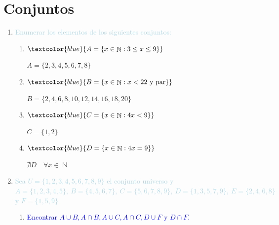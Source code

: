 \documentclass{article}
\newcommand{\lb}[1]{\textcolor{lightblue}{#1}}
\newcommand{\db}[1]{\textcolor{blue}{#1}}
\DeclareMathOperator{\N}{\mathbb{N}}
\begin{document}
\section{Conjuntos}
\begin{enumerate}[label=\color{red}\textbf{\arabic*)},leftmargin=*]
      \item \lb{Enumerar los elementos de los siguientes conjuntos:}
      \begin{enumerate}[label=\color{red}\alph*)]
      	\item $\db{A=\{x\in\N:3\le x\le 9\}}$
      	
      	$A=\{2,3,4,5,6,7,8\}$
      	\item $\db{B=\{x\in\N:x<22\text{ y par}\}}$
      	
      	$B=\{2,4,6,8,10,12,14,16,18, 20\}$
      	\item $\db{C=\{x\in\N:4x<9\}}$
      	
      	$C=\{1,2\}$
      	\item $\db{D=\{x\in\N:4x=9\}}$
      	
      	$\nexists D\quad\forall x\in\N$
      	\end{enumerate}
      \item \lb{Sea $U=\{1,2,3,4,5,6,7,8,9\}$ el conjunto universo y $A=\{1,2,3,4,5\},\:B=\{4,5,6,7\},\:C=\{5,6,7,8,9\},\:D=\{1,3,5,7,9\},\:E=\{2,4,6,8\}$ y $F=\{1,5,9\}$}
      \begin{enumerate}[label=\color{red}\alph*)]
      	\item \db{Encontrar $A\cup B,A\cap B,A\cup C,A\cap C,D\cup F$ y $D\cap F$.}
      	

\end{enumerate}
\end{enumerate}
\end{document}
